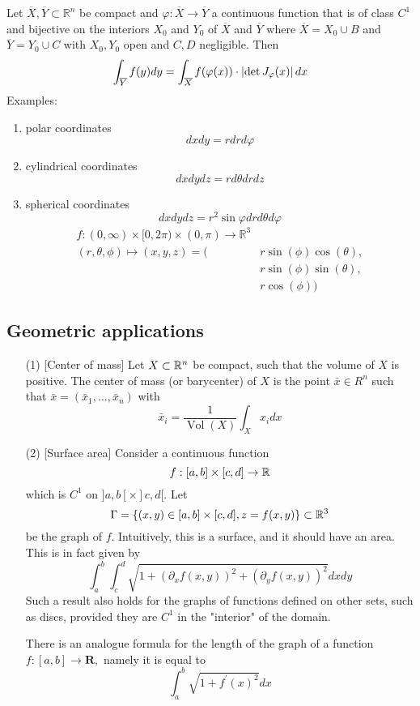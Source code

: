 Let $\overline{X},\overline{Y}\subset\mathbb{R}^n$ be compact and $\varphi\colon \overline{X} \to \overline{Y}$ a continuous function that is of class $C^1$ and bijective on the interiors $X_0$ and $Y_0$ of $\overline{X}$ and $\overline{Y}$ where $\overline{X} = X_0 \cup B$ and $\overline{Y} = Y_0 \cup C$ with $X_0, Y_0$ open and $C,D$ negligible. Then 
$$\int_{\overline{Y}} f(y) dy = \int_{\overline{X}} f(\varphi(x)) \cdot \left\lvert \det J_{\varphi}(x) \right\rvert dx$$
Examples:
    \begin{enumerate}
        \item polar coordinates
        $$dx dy = r dr d\varphi$$
        
        \item cylindrical coordinates
        $$dx dy dz = r d\theta dr dz$$
        
        \item spherical coordinates
        $$dx dy dz = r^2 \sin\varphi dr d\theta d\varphi$$
        \begin{align*}
        	f\colon (0,\infty)\times[0,2\pi)\times (0,\pi)\to \mathbb{R}^3\\
        (r,\theta, \phi) \mapsto (x,y, z) = (&r \sin(\phi)\cos(\theta), \\
        										 &r \sin(\phi)\sin(\theta), \\
        										 &r\cos(\phi))
        \end{align*}

    \end{enumerate}


\subsection{Geometric applications}

\begin{enumerate}
\item[(1)] [Center of mass] Let $X \subset \mathbb{R}^n$ be compact, such that the volume of $X$ is positive. The center of mass (or barycenter) of $X$ is the point $\bar{x} \in R^{n}$ such that $\bar{x}=\left(\bar{x}_{1}, \ldots, \bar{x}_{n}\right)$ with
$$
\bar{x}_{i}=\frac{1}{\operatorname{Vol}(X)} \int_{X} x_{i} d x
$$

\item[(2)] [Surface area] Consider a continuous function
$$
f:[a, b] \times[c, d] \rightarrow \mathbb{R}
$$
which is $C^{1}$ on $] a, b[\times] c, d[.$ Let
$$
\Gamma=\left\{(x, y) \in[a, b] \times[c, d], z=f(x, y)\right\} \subset \mathbb{R}^{3}
$$
be the graph of $f$. Intuitively, this is a surface, and it should have an area. This is in fact given by
$$
\int_{a}^{b} \int_{c}^{d} \sqrt{1+\left(\partial_{x} f(x, y)\right)^{2}+\left(\partial_{y} f(x, y)\right)^{2}} d x d y
$$
Such a result also holds for the graphs of functions defined on other sets, such as discs, provided they are $C^{1}$ in the "interior" of the domain.

There is an analogue formula for the length of the graph of a function $f:[a, b] \rightarrow \mathbf{R},$ namely it is equal to
$$
\int_{a}^{b} \sqrt{1+f^{\prime}(x)^{2}} d x
$$
\end{enumerate}

